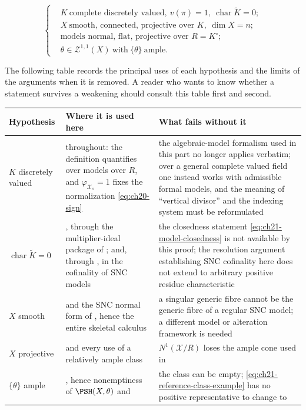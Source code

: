 \begin{equation}
\label{eq:ch21-hypotheses}
\left\{
\begin{aligned}
 &K\ \text{complete discretely valued},\ v(\pi)=1,\
   \operatorname{char}\widetilde K=0;\\
 &X\ \text{smooth, connected, projective over }K,\ \dim X=n;\\
 &\text{models normal, flat, projective over }R=K^\circ;\\
 &\theta\in\mathcal Z^{1,1}(X)\ \text{with}\ \{\theta\}\ \text{ample}.
\end{aligned}
\right.
\end{equation}

The following table records the principal uses of each hypothesis and
the limits of the arguments when it is removed.  A reader who
wants to know whether a statement survives a weakening should consult this
table first and \Cref{sec:ch21-dictionary} second.

\begin{center}
\small
\begin{tabular}{p{}|p{}|p{}}
\toprule
\textbf{Hypothesis}&\textbf{Where it is used here}
 &\textbf{What fails without it}\\
\midrule
$K$ discretely valued
 &throughout: the definition quantifies over models over $R$, and
  $\varphi_{\mathcal X_s}=1$ fixes the normalization \eqref{eq:ch20-sign}
 &the algebraic-model formalism used in this part no longer applies
  verbatim; over a general complete valued field one instead works with
  admissible formal models, and the meaning of ``vertical divisor'' and the
  indexing system must be reformulated\\
$\operatorname{char}\widetilde K=0$
 &\Cref{thm:ch21-model-consistency}, through the multiplier-ideal package
  of \Cref{sec:ch21-multiplier-input}; and, through
  \Cref{prop:snc-cofinal}, in the cofinality of SNC models
 &the closedness statement \eqref{eq:ch21-model-closedness} is not
  available by this proof; the resolution argument establishing SNC
  cofinality here does not extend to arbitrary positive residue characteristic\\
$X$ smooth
 &\Cref{prop:snc-cofinal} and the SNC normal form of
  \Cref{lem:snc-normal-form}, hence the entire skeletal calculus
 &a singular generic fibre cannot be the generic fibre of a regular
  SNC model; a different model or alteration framework is needed\\
$X$ projective
 &\Cref{thm:ch20-ddc-exact} and every use of a relatively ample class
 &$N^1(\mathcal X/R)$ loses the ample cone used in
  \Cref{prop:ch20-model-max}\\
$\{\theta\}$ ample
 &\Cref{prop:ch20-positive-representative}, hence nonemptiness of
  $\PSH(X,\theta)$ and \Cref{prop:ch21-constants}
 &the class can be empty; \eqref{eq:ch21-reference-class-example} has no
  positive representative to change to\\
\bottomrule
\end{tabular}
\end{center}

